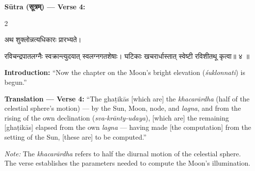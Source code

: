 \documentclass[11pt,a4paper]{article}
\newcommand{\dev}[1]{{\devanagarifont #1}}
\newenvironment{sanskritverse}{%
  \begin{center}\begin{minipage}{0.95\textwidth}
  \setlength{\leftskip}{1em}
  \setlength{\rightskip}{1em}
  \dev
}{\end{minipage}\end{center}}
\begin{document}
\vspace{0.5em}
\noindent\textbf{Sūtra (\dev{सूत्रम्}) — Verse 4:}

\begin{paracol}{2}

\begin{sanskritverse}
अथ शुक्लोन्नत्यधिकारः प्रारभ्यते।
\end{sanskritverse}

\begin{sanskritverse}
रविचन्द्रपातलग्नैः स्वक्रान्त्युदयात् स्वलग्नगतशेषाः।
घटिकाः खचरार्धास्तात् स्वेष्टी रविशीतथू कृत्वा॥ ४ ॥
\end{sanskritverse}

\switchcolumn

\textbf{Introduction:} ``Now the chapter on the Moon's bright elevation (\textit{śuklonnati}) is begun.''

\textbf{Translation — Verse 4:} ``The ghaṭikās [which are] the \textit{khacarārdha} (half of the celestial sphere's motion) --- by the Sun, Moon, node, and \textit{lagna}, and from the rising of the own declination (\textit{sva-krānty-udaya}), [which are] the remaining [ghaṭikās] elapsed from the own \textit{lagna} --- having made [the computation] from the setting of the Sun, [these are] to be computed.''

\textit{Note:} The \textit{khacarārdha} refers to half the diurnal motion of the celestial sphere. The verse establishes the parameters needed to compute the Moon's illumination.

\end{paracol}

\vspace{0.5em}
\end{document}
